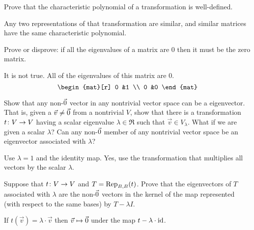 \begin{exercises}
    Prove that 
    the characteristic polynomial of a transformation is well-defined.
    \begin{answer}
      Any two representations of that transformation are similar, and
      similar matrices have the same characteristic polynomial.  
    \end{answer}
  \item Prove or disprove: if all the eigenvalues of a matrix are $0$ 
    then it must be the zero matrix.
    \begin{answer}
      It is not true.
      All of the eigenvalues of this matrix are $0$.
      \begin{equation*}
        \begin{mat}[r]
          0  &1  \\
          0  &0
        \end{mat}
      \end{equation*}
    \end{answer}
  \recommended \item 
    \begin{exparts}
      \partsitem Show that any non-\( \zero \) vector in any nontrivial 
        vector space can be a eigenvector.
        That is, given a \( \vec{v}\neq\zero \) from a nontrivial \( V \),
        show that there is a transformation \( \map{t}{V}{V} \) having a scalar
        eigenvalue \( \lambda\in\Re \) such that \( \vec{v}\in V_\lambda \).
      \partsitem What if we are given a scalar \( \lambda \)?
        Can any non-\( \zero \) member of any
        nontrivial vector space be an eigenvector associated with \( \lambda \)?
    \end{exparts}
    \begin{answer}
      \begin{exparts}
        \partsitem Use \( \lambda=1 \) and the identity map.
        \partsitem Yes, use the transformation that multiplies all 
          vectors by the scalar \( \lambda \).
      \end{exparts}  
     \end{answer}
  \recommended \item 
    Suppose that \( \map{t}{V}{V} \) and \( T=\rep{t}{B,B} \).
    Prove that the eigenvectors of \( T \) associated with \( \lambda \) are
    the non-\( \zero \) vectors in the kernel of the map represented
    (with respect to the same bases) by \( T-\lambda I \).
    \begin{answer}
      If $t(\vec{v})=\lambda\cdot\vec{v}$ then 
      $\vec{v}\mapsto\zero$ under the map $t-\lambda\cdot\identity$.

\end{answer}
\end{exercises}
